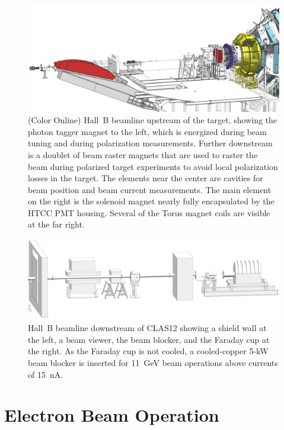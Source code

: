 \documentclass[final,3p,twocolumn]{elsarticle}
\begin{document}
\begin{figure}[htbp!]
\centerline{\includegraphics[width=2.0\columnwidth]{beamline-1.png}}
\caption{(Color Online) Hall~B beamline upstream of the target, showing the photon tagger magnet to the left, which is energized
during beam tuning and during polarization measurements. Further downstream is a doublet of beam raster magnets
that are used to raster the beam during polarized target experiments to avoid local polarization losses in the target.
The elements near the center are cavities for beam position and beam current measurements. The main element 
on the right is the solenoid magnet nearly fully encapsulated by the HTCC PMT housing. Several of the Torus magnet
coils are visible at the far right.}
\label{beamline-upstream}
\end{figure}

\begin{figure}[htbp!]
\centerline{\includegraphics[width=2.0\columnwidth]{beamline-3.png}}
\caption{Hall~B beamline downstream of CLAS12 showing a shield wall at the left, a beam viewer, the beam blocker,
and the Faraday cup at the right. As the Faraday cup is not cooled, a cooled-copper 5-kW beam blocker is inserted
for 11~GeV beam operations above currents of 15~nA.}
\label{beamline-downstream}
\end{figure}

\section{Electron Beam Operation} 
\end{document}
